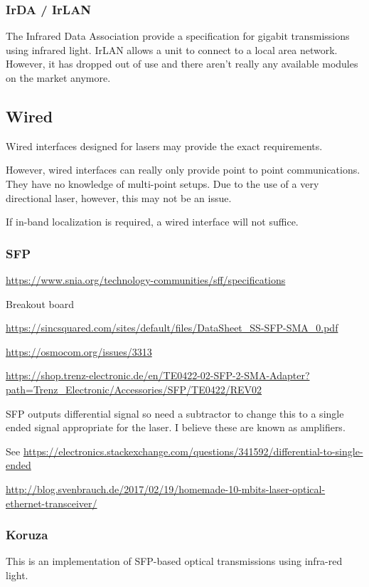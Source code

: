 \documentclass{article}
\begin{document}
\subsubsection{IrDA / IrLAN}
The Infrared Data Association provide a specification for gigabit transmissions
using infrared light. IrLAN allows a unit to connect to a local area network.
However, it has dropped out of use and there aren't really any available
modules on the market anymore.

\subsection{Wired}
Wired interfaces designed for lasers may provide the exact requirements.

However, wired interfaces can really only provide point to point
communications. They have no knowledge of multi-point setups. Due to the use
of a very directional laser, however, this may not be an issue.

If in-band localization is required, a wired interface will not suffice.

\subsubsection{\ac{SFP}}

\url{https://www.snia.org/technology-communities/sff/specifications}

Breakout board

\url{https://sincsquared.com/sites/default/files/DataSheet_SS-SFP-SMA_0.pdf}

\url{https://osmocom.org/issues/3313}

\url{https://shop.trenz-electronic.de/en/TE0422-02-SFP-2-SMA-Adapter?path=Trenz_Electronic/Accessories/SFP/TE0422/REV02}

\ac{SFP} outputs differential signal so need a subtractor to change this to
a single ended signal appropriate for the laser. I believe these are known as
amplifiers.

See \url{https://electronics.stackexchange.com/questions/341592/differential-to-single-ended}

\url{http://blog.svenbrauch.de/2017/02/19/homemade-10-mbits-laser-optical-ethernet-transceiver/}

\subsubsection{Koruza}
This is an implementation of \ac{SFP}-based optical transmissions using
infra-red light.
\end{document}
